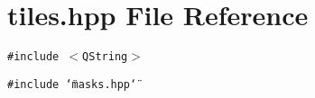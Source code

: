 \section{tiles.hpp File Reference}
\label{tiles_8hpp}
{\tt \#include $<$QString$>$}\par
{\tt \#include \char`\"{}masks.hpp\char`\"{}}\par
